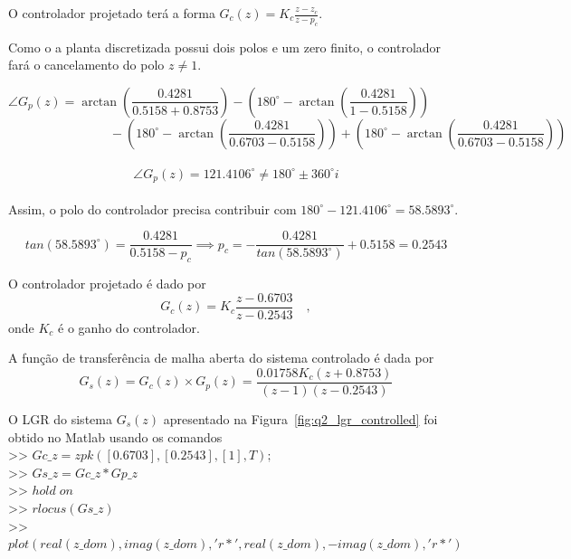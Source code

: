 \documentclass{article}
\begin{document}
        {O controlador projetado terá a forma $G_c(z) = K_c\frac{z - z_c}{z - p_c}$.

        {Como o a planta discretizada possui dois polos e um zero finito, o
            controlador fará o cancelamento do polo $z \neq 1$.}

        \[ \angle G_p(z) = \arctan\left( \frac{0.4281}{ 0.5158 + 0.8753 } \right)
                - \left(180^\circ - \arctan\left( \frac{0.4281}{ 1 - 0.5158 } \right) \right) \qquad\qquad\]
        \[\qquad\qquad\qquad\qquad - \left(180^\circ - \arctan\left( \frac{0.4281}{ 0.6703 - 0.5158 } \right) \right)
                + \left(180^\circ - \arctan\left( \frac{0.4281}{ 0.6703 - 0.5158 } \right) \right) \]\\
        \[ \angle G_p(z) = 121.4106^\circ \neq 180^\circ \pm 360^\circ i \]\\

        {Assim, o polo do controlador precisa contribuir com
        $180^\circ - 121.4106^\circ = 58.5893^\circ$.}

        \[ tan(58.5893^\circ) = \frac{0.4281}{ 0.5158 - p_c}
            \implies p_c = -\frac{0.4281}{tan(58.5893^\circ)} + 0.5158 = 0.2543 \]

        {O controlador projetado é dado por}
        \[ G_c(z) = K_c\frac{z - 0.6703}{z - 0.2543} \quad , \]
        {onde $K_c$ é o ganho do controlador.}

        {A função de transferência de malha aberta do sistema controlado é dada por}
        \[ G_s(z) = G_c(z) \times G_p(z) = \frac{0.01758K_c(z+0.8753)}{(z-1)(z-0.2543)} \]

        {O LGR do sistema $G_s(z)$ apresentado na Figura~\ref{fig:q2_lgr_controlled}
            foi obtido no Matlab usando os comandos\\
        >> $ Gc\_z = zpk([0.6703], [0.2543], [1], T); $\\
        >> $ Gs\_z = Gc\_z * Gp\_z $\\
        >> $ hold \; on $\\
        >> $ rlocus(Gs\_z) $\\
        >> $ plot(real(z\_dom),imag(z\_dom),'r*',real(z\_dom),-imag(z\_dom),'r*') $ }\\

}
\end{document}
